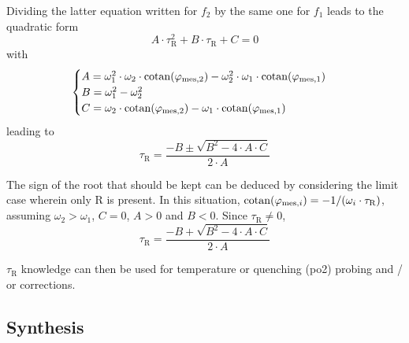 Dividing the latter equation written for $f_2$ by the same one for $f_1$ leads to the quadratic form
\begin{equation}
	A \cdot \tau_\mathrm{R}^2 + B \cdot \tau_\mathrm{R} + C = 0
\end{equation}
with
\begin{equation}
	\begin{cases}
		A = \omega_1^2 \cdot \omega_2 \cdot \operatorname{cotan}(\varphi_{\text{mes}, 2}) - \omega_2^2 \cdot \omega_1 \cdot \operatorname{cotan}(\varphi_{\text{mes}, 1})\\
		B = \omega_1^2 - \omega_2^2\\
		C = \omega_2 \cdot \operatorname{cotan}(\varphi_{\text{mes}, 2}) - \omega_1 \cdot \operatorname{cotan}(\varphi_{\text{mes}, 1})
	\end{cases}
\end{equation}
leading to
\begin{equation}
	\tau_\mathrm{R} = \frac{-B \pm \sqrt{B^2 - 4 \cdot A \cdot C}}{2 \cdot A}
\end{equation}

The sign of the root that should be kept can be deduced by considering the limit case wherein only R is present. In this situation, $\operatorname{cotan}(\varphi_{\text{mes}, i}) = -1/(\omega_i \cdot \tau_\mathrm{R})$, assuming $\omega_2 > \omega_1$, $C=0$, $A > 0$ and $B<0$. Since $\tau_\mathrm{R} \neq 0$,
\begin{equation}
	\tau_\mathrm{R} = \frac{-B + \sqrt{B^2 - 4 \cdot A \cdot C}}{2 \cdot A}
\end{equation}

$\tau_\mathrm{R}$ knowledge can then be used for temperature or quenching (\gls{po2}) probing and / or corrections\cite{neurauter2000_phd, borisov2007_ultra}.


\subsection{Synthesis}

